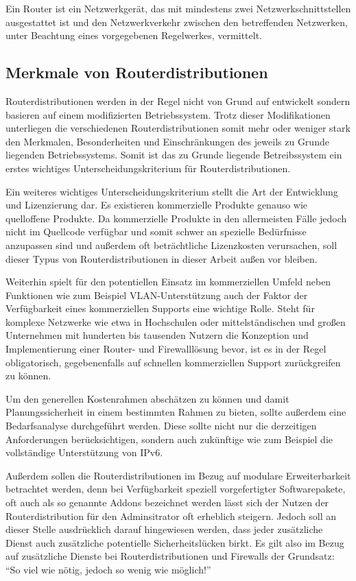 \documentclass[a4paper,12pt]{scrartcl}
\begin{document}
Ein Router ist ein Netzwerkgerät, das mit mindestens zwei
Netzwerkschnittstellen ausgestattet ist und den Netzwerkverkehr zwischen den
betreffenden Netzwerken, unter Beachtung eines vorgegebenen Regelwerkes,
vermittelt.

\subsection{Merkmale von Routerdistributionen}
Routerdistributionen werden in der Regel nicht von Grund auf entwickelt sondern
basieren auf einem modifizierten Betriebssystem. Trotz dieser Modifikationen
unterliegen die verschiedenen Routerdistributionen somit mehr oder weniger
stark den Merkmalen, Besonderheiten und Einschr\"ankungen des jeweils zu Grunde
liegenden Betriebssystems. Somit ist das zu Grunde liegende Betreibssystem ein
erstes wichtiges Unterscheidungskriterium f\"ur Routerdistributionen.

Ein weiteres wichtiges Unterscheidungskriterium stellt die Art der Entwicklung
und Lizenzierung dar. Es existieren kommerzielle Produkte genauso wie
quelloffene Produkte. Da kommerzielle Produkte in den allermeisten F\"alle
jedoch nicht im Quellcode verf\"ugbar und somit schwer an spezielle
Bed\"urfnisse anzupassen sind und au\ss{}erdem oft betr\"achtliche Lizenzkosten
verursachen, soll dieser Typus von Routerdistributionen in dieser Arbeit
au\ss{}en vor bleiben. 
 
Weiterhin spielt f\"ur den potentiellen Einsatz im kommerziellen Umfeld
neben Funktionen wie zum Beispiel VLAN-Unterst\"utzung auch der Faktor der
Verf\"ugbarkeit eines kommerziellen Supports eine wichtige Rolle. Steht f\"ur
komplexe Netzwerke wie etwa in Hochschulen oder mittelst\"andischen und
gro\ss{}en Unternehmen mit hunderten bis tausenden Nutzern die Konzeption und
Implementierung einer Router- und Firewalll\"osung bevor, ist es in der Regel
obligatorisch, gegebenenfalls auf schnellen kommerziellen Support
zur\"uckgreifen zu k\"onnen.

Um den generellen Kostenrahmen absch\"atzen zu k\"onnen und damit
Planungssicherheit in einem bestimmten Rahmen zu bieten, sollte au\ss{}erdem
eine Bedarfsanalyse durchgef\"uhrt werden. Diese sollte nicht nur die
derzeitigen Anforderungen ber\"ucksichtigen, sondern auch zuk\"unftige wie zum
Beispiel die vollst\"andige Unterst\"utzung von IPv6.

Au\ss{}erdem sollen die Routerdistributionen im Bezug auf modulare
Erweiterbarkeit betrachtet werden, denn bei Verf\"ugbarkeit speziell
vorgefertigter Softwarepakete, oft auch als so genannte Addons bezeichnet
werden l\"asst sich der Nutzen der Routerdistribution f\"ur den Adminsitrator
oft erheblich steigern. Jedoch soll an dieser Stelle ausdr\"ucklich darauf
hingewiesen werden, dass jeder zus\"atzliche Dienst auch zus\"atzliche
potentielle Sicherheitsl\"ucken birkt. Es gilt also im Bezug auf zus\"atzliche
Dienste bei Routerdistributionen und Firewalls der Grundsatz: ``So viel wie
n\"otig, jedoch so wenig wie m\"oglich!''
 
\end{document}
